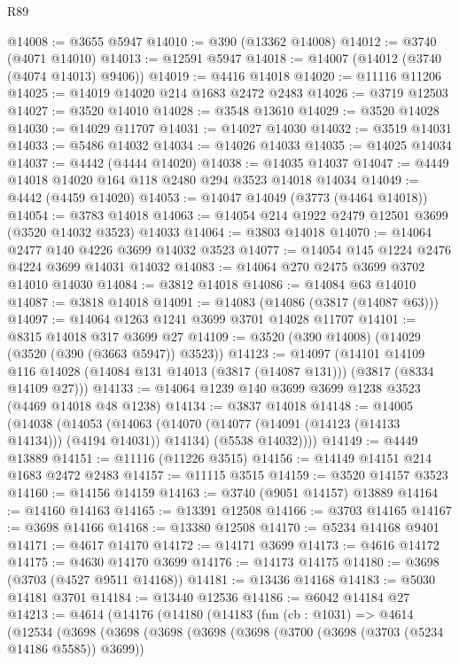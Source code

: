 \begin{lexlean}{R89}
\begin{coremodule}
@14008 := @3655 @5947
@14010 := @390 (@13362 @14008)
@14012 := @3740 (@4071 @14010)
@14013 := @12591 @5947
@14018 := @14007 (@14012 (@3740 (@4074 @14013) @9406))
@14019 := @4416 @14018
@14020 := @11116 @11206
@14025 := @14019 @14020 @214 @1683 @2472 @2483
@14026 := @3719 @12503
@14027 := @3520 @14010
@14028 := @3548 @13610
@14029 := @3520 @14028
@14030 := @14029 @11707
@14031 := @14027 @14030
@14032 := @3519 @14031
@14033 := @5486 @14032
@14034 := @14026 @14033
@14035 := @14025 @14034
@14037 := @4442 (@4444 @14020)
@14038 := @14035 @14037
@14047 := @4449 @14018 @14020 @164 @118 @2480 @294 @3523 @14018 @14034
@14049 := @4442 (@4459 @14020)
@14053 := @14047 @14049 (@3773 (@4464 @14018))
@14054 := @3783 @14018
@14063 := @14054 @214 @1922 @2479 @12501 @3699 (@3520 @14032 @3523) @14033
@14064 := @3803 @14018
@14070 := @14064 @2477 @140 @4226 @3699 @14032 @3523
@14077 := @14054 @145 @1224 @2476 @4224 @3699 @14031 @14032
@14083 := @14064 @270 @2475 @3699 @3702 @14010 @14030
@14084 := @3812 @14018
@14086 := @14084 @63 @14010
@14087 := @3818 @14018
@14091 := @14083 (@14086 (@3817 (@14087 @63)))
@14097 := @14064 @1263 @1241 @3699 @3701 @14028 @11707
@14101 := @8315 @14018 @317 @3699 @27
@14109 := @3520 (@390 @14008) (@14029 (@3520 (@390 (@3663 @5947)) @3523))
@14123 := @14097
    (@14101
      @14109
      @116
      @14028
      (@14084 @131 @14013 (@3817 (@14087 @131)))
      (@3817 (@8334 @14109 @27)))
@14133 := @14064 @1239 @140 @3699 @3699 @1238 @3523 (@4469 @14018 @48 @1238)
@14134 := @3837 @14018
@14148 := @14005
    (@14038
      (@14053
        (@14063
          (@14070 (@14077 (@14091 (@14123 (@14133 @14134))) (@4194 @14031)) @14134)
          (@5538 @14032))))
@14149 := @4449 @13889
@14151 := @11116 (@11226 @3515)
@14156 := @14149 @14151 @214 @1683 @2472 @2483
@14157 := @11115 @3515
@14159 := @3520 @14157 @3523
@14160 := @14156 @14159
@14163 := @3740 (@9051 @14157) @13889
@14164 := @14160 @14163
@14165 := @13391 @12508
@14166 := @3703 @14165
@14167 := @3698 @14166
@14168 := @13380 @12508
@14170 := @5234 @14168 @9401
@14171 := @4617 @14170
@14172 := @14171 @3699
@14173 := @4616 @14172
@14175 := @4630 @14170 @3699
@14176 := @14173 @14175
@14180 := @3698 (@3703 (@4527 @9511 @14168))
@14181 := @13436 @14168
@14183 := @5030 @14181 @3701
@14184 := @13440 @12536
@14186 := @6042 @14184 @27
@14213 := @4614
    (@14176
      (@14180
        (@14183
          (fun (cb : @1031) =>
          @4614
            (@12534
              (@3698
                (@3698
                  (@3698
                    (@3698
                      (@3698
                        (@3700 (@3698 (@3703 (@5234 @14186 @5585)) @3699))

\end{coremodule}
\end{lexlean}
